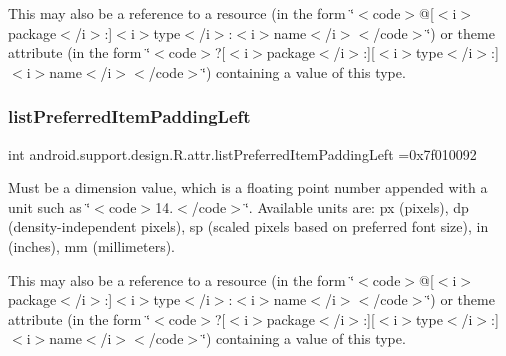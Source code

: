 This may also be a reference to a resource (in the form \char`\"{}$<$code$>$@\mbox{[}$<$i$>$package$<$/i$>$\+:\mbox{]}$<$i$>$type$<$/i$>$\+:$<$i$>$name$<$/i$>$$<$/code$>$\char`\"{}) or theme attribute (in the form \char`\"{}$<$code$>$?\mbox{[}$<$i$>$package$<$/i$>$\+:\mbox{]}\mbox{[}$<$i$>$type$<$/i$>$\+:\mbox{]}$<$i$>$name$<$/i$>$$<$/code$>$\char`\"{}) containing a value of this type. \mbox{\label{classandroid_1_1support_1_1design_1_1R_1_1attr_a8f6dc9aede7141a5cd6d4242cdb5cf80}} 
\subsubsection{\texorpdfstring{list\+Preferred\+Item\+Padding\+Left}{listPreferredItemPaddingLeft}}
{\footnotesize\ttfamily int android.\+support.\+design.\+R.\+attr.\+list\+Preferred\+Item\+Padding\+Left =0x7f010092\hspace{0.3cm}{\ttfamily [static]}}

Must be a dimension value, which is a floating point number appended with a unit such as \char`\"{}$<$code$>$14.\+5sp$<$/code$>$\char`\"{}. Available units are\+: px (pixels), dp (density-\/independent pixels), sp (scaled pixels based on preferred font size), in (inches), mm (millimeters). 

This may also be a reference to a resource (in the form \char`\"{}$<$code$>$@\mbox{[}$<$i$>$package$<$/i$>$\+:\mbox{]}$<$i$>$type$<$/i$>$\+:$<$i$>$name$<$/i$>$$<$/code$>$\char`\"{}) or theme attribute (in the form \char`\"{}$<$code$>$?\mbox{[}$<$i$>$package$<$/i$>$\+:\mbox{]}\mbox{[}$<$i$>$type$<$/i$>$\+:\mbox{]}$<$i$>$name$<$/i$>$$<$/code$>$\char`\"{}) containing a value of this type. \mbox{\label{classandroid_1_1support_1_1design_1_1R_1_1attr_a35b15db2513263f58557a28063e21a25}} 
